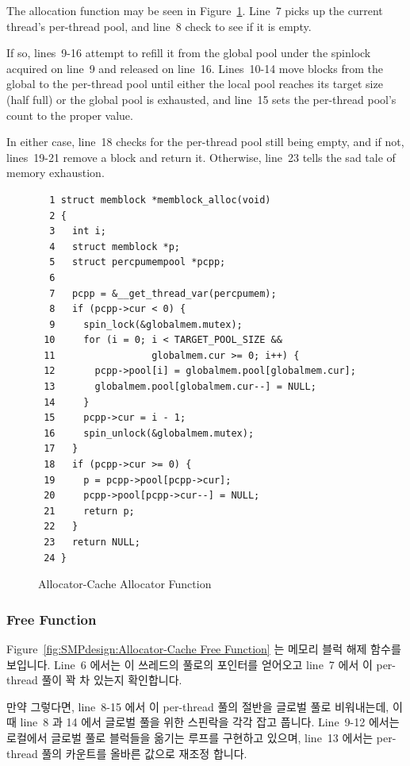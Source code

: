 The allocation function  may be seen in
Figure~\ref{fig:SMPdesign:Allocator-Cache Allocator Function}.
Line~7 picks up the current thread's per-thread pool,
and line~8 check to see if it is empty.

If so, lines~9-16 attempt to refill it from the global pool
under the spinlock acquired on line~9 and released on line~16.
Lines~10-14 move blocks from the global to the per-thread pool until
either the local pool reaches its target size (half full) or
the global pool is exhausted, and line~15 sets the per-thread pool's
count to the proper value.

In either case, line~18 checks for the per-thread pool still being
empty, and if not, lines~19-21 remove a block and return it.
Otherwise, line~23 tells the sad tale of memory exhaustion.
\fi

\begin{figure}[htbp]
{ \scriptsize
\begin{verbatim}
  1 struct memblock *memblock_alloc(void)
  2 {
  3   int i;
  4   struct memblock *p;
  5   struct percpumempool *pcpp;
  6
  7   pcpp = &__get_thread_var(percpumem);
  8   if (pcpp->cur < 0) {
  9     spin_lock(&globalmem.mutex);
 10     for (i = 0; i < TARGET_POOL_SIZE &&
 11                 globalmem.cur >= 0; i++) {
 12       pcpp->pool[i] = globalmem.pool[globalmem.cur];
 13       globalmem.pool[globalmem.cur--] = NULL;
 14     }
 15     pcpp->cur = i - 1;
 16     spin_unlock(&globalmem.mutex);
 17   }
 18   if (pcpp->cur >= 0) {
 19     p = pcpp->pool[pcpp->cur];
 20     pcpp->pool[pcpp->cur--] = NULL;
 21     return p;
 22   }
 23   return NULL;
 24 }
\end{verbatim}
}
\caption{Allocator-Cache Allocator Function}
\label{fig:SMPdesign:Allocator-Cache Allocator Function}
\end{figure}

\subsubsection{Free Function}
Figure~\ref{fig:SMPdesign:Allocator-Cache Free Function} 는 메모리 블럭 해제
함수를 보입니다.
Line~6 에서는 이 쓰레드의 풀로의 포인터를 얻어오고 line~7 에서 이 per-thread
풀이 꽉 차 있는지 확인합니다.

만약 그렇다면, line~8-15 에서 이 per-thread 풀의 절반을 글로벌 풀로 비워내는데,
이 때 line~8 과 14 에서 글로벌 풀을 위한 스핀락을 각각 잡고 풉니다.
Line~9-12 에서는 로컬에서 글로벌 풀로 블럭들을 옮기는 루프를 구현하고 있으며,
line~13 에서는 per-thread 풀의 카운트를 올바른 값으로 재조정 합니다.

